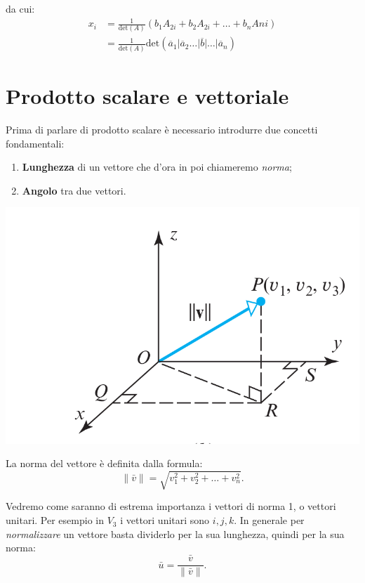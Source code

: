 \documentclass[x11names]{article}
\begin{document}
da cui: 
\begin{align*}
    x_i &= \frac{1}{\text{det}(A)}(b_1 A_{2i} + b_2  A_{2i} + \dots + b_nA{ni})  \\
   &= \frac{1}{\text{det}(A)} \text{det}(\overline{a}_1 | \overline{a}_2 \dots |\overline{b}| \dots |\overline{a}_n)
\end{align*}




\newpage
\section{Prodotto scalare e vettoriale}
Prima di parlare di prodotto scalare è necessario introdurre due concetti fondamentali:

\begin{enumerate}
	\item \textbf{Lunghezza} di un vettore che d'ora in poi chiameremo \textit{norma};
	\item \textbf{Angolo} tra due vettori.
\end{enumerate}

\begin{center}
\includegraphics[scale=0.2]{figures/norma.png}
\end{center}

La norma del vettore è definita dalla formula:
\[
\|\bar{v}\| = \sqrt{v_1^2 + v_2^2 + \dots + v_{n}^2}
.\] 

Vedremo come saranno di estrema importanza i vettori di norma 1, o vettori unitari. Per esempio in $V_3$ i vettori unitari sono $i,j,k$. In generale per \textit{normalizzare} un vettore basta dividerlo per la sua lunghezza, quindi per la sua norma:
\[
\bar{u} = \frac{\bar{v}}{\|\bar{v}\|}
.\] 
\end{document}
